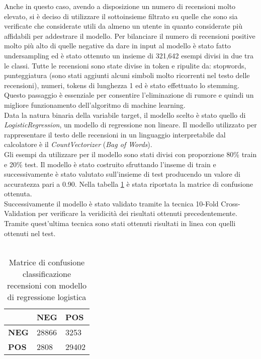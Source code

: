 Anche in questo caso, avendo a disposizione un numero di recensioni molto elevato, si è deciso di utilizzare il sottoinsieme filtrato su quelle che sono sia verificate che considerate utili da almeno un utente in quanto considerate più affidabili per addestrare il modello. Per bilanciare il numero di recensioni positive molto più alto di quelle negative da dare in input al modello è stato fatto undersampling ed è stato ottenuto un insieme di 321,642 esempi divisi in due tra le classi. 
Tutte le recensioni sono state divise in token e ripulite da: stopwords, punteggiatura (sono stati aggiunti alcuni simboli molto ricorrenti nel testo delle recensioni), numeri, tokens di lunghezza 1 ed è stato effettuato lo stemming. Questo passaggio è essenziale per consentire l'eliminazione di rumore e quindi un migliore funzionamento dell'algoritmo di machine learning. \\
Data la natura binaria della variabile target, il modello scelto è stato quello di \textit{LogisticRegression}, un modello di regressione non lineare. Il modello utilizzato per rappresentare il testo delle recensioni in un linguaggio interpretabile dal calcolatore è il \textit{CountVectorizer} (\textit{Bag of Words}).\\
Gli esempi da utilizzare per il modello sono stati divisi con proporzione 80\% train e 20\% test. Il modello è stato costruito sfruttando l'inseme di train e successivamente è stato valutato sull'insieme di test producendo un valore di accuratezza pari a 0.90. Nella tabella \ref{tab:matriceConfusioneModello} è stata riportata la matrice di confusione ottenuta. 
\\
Successivamente il modello è stato validato tramite la tecnica 10-Fold Cross-Validation per verificare la veridicità dei risultati ottenuti precedentemente. Tramite quest'ultima tecnica sono stati ottenuti risultati in linea con quelli ottenuti nel test.\\\\
\begin{table}[H]\centering
    \begin{tabular}{l|l|l|}
    \cline{2-3}
     & \textbf{NEG} & \textbf{POS} \\ \hline
    \multicolumn{1}{|l|}{\textbf{NEG}} & 28866 & 3253 \\ \hline
    \multicolumn{1}{|l|}{\textbf{POS}} & 2808 & 29402 \\ \hline
    \end{tabular}
    \caption{Matrice di confusione classificazione recensioni con modello di regressione logistica}
    \label{tab:matriceConfusioneModello}
\end{table}

